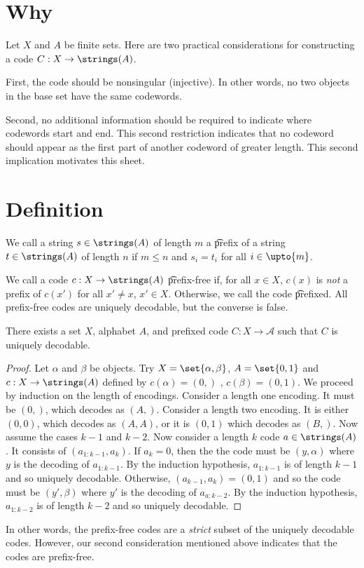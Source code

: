 

\section*{Why}

Let $X$ and $A$ be finite sets.
Here are two practical considerations for constructing a code $C: X \to \strings(A)$.

First, the code should be nonsingular (injective).
In other words, no two objects in the base set have the same codewords.

Second, no additional information should be required to indicate where codewords start and end.
This second restriction indicates that no codeword should appear as the first part of another codeword of greater length.
This second implication motivates this sheet.

\section*{Definition}

We call a string $s \in \strings(A)$ of length $m$ a \t{prefix} of a string $t \in \strings(A)$ of length $n$ if $m \leq n$ and $s_i = t_i$ for all $i \in \upto{m}$.

We call a code $c: X \to \strings(A)$ \t{prefix-free} if, for all $x \in X$, $c(x)$ is \textit{not} a prefix of $c(x')$ for all $x' \neq x$, $x' \in X$.
Otherwise, we call the code \t{prefixed}.
All prefix-free codes are uniquely decodable, but the converse is false.

\begin{proposition}
There exists a set $X$, alphabet $A$, and prefixed code $C: X \to \mathcal{A} $ such that $C$ is uniquely decodable.\end{proposition}
\begin{proof}Let $\alpha $ and $\beta $ be objects.
Try $X = \set{\alpha , \beta }$, $A = \set{0, 1}$ and $c: X \to \strings(A)$ defined by $c(\alpha ) = (0,)$ , $c(\beta ) = (0,1)$.
We proceed by induction on the length of encodings.
Consider a length one encoding.
It must be $(0,)$, which decodes as $(A,)$.
Consider a length two encoding.
It is either $(0,0)$, which decodes as $(A,A)$, or it is $(0,1)$ which decodes as $(B,)$.
Now assume the cases $k-1$ and $k-2$.
Now consider a length $k$ code $a \in \strings(A)$.
It consists of $(a_{1:k-1},a_k)$.
If $a_k = 0$, then the the code must be $(y, \alpha )$ where $y$ is the decoding of $a_{1:k-1}$.
By the induction hypothesis, $a_{1:k-1}$ is of length $k-1$ and so uniquely decodable.
Otherwise, $(a_{k-1}, a_k) = (0,1)$ and so the code must be $(y', \beta )$ where $y'$ is the decoding of $a_{a:k-2}$.
By the induction hypothesis, $a_{1:k-2}$ is of length $k-2$ and so uniquely decodable.\end{proof}
In other words, the prefix-free codes are a \textit{strict} subset of the uniquely decodable codes.
However, our second consideration mentioned above indicates that the  codes are prefix-free.
